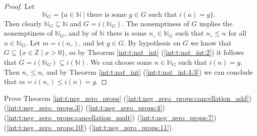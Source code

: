 \begin{proof}
	Let
	\[
		\mathbb{N}_{G} = \{ a \in \mathbb{N} \mid \text{there is some } g \in G \text{ such that } i(a) = g \}.
	\]
	Then clearly $\mathbb{N}_{G} \subseteq \mathbb{N}$ and $G = i(\mathbb{N}_{G})$. The nonemptiness of $G$ implies the nonemptiness of $\mathbb{N}_{G}$, and by  of $\mathbb{N}$ there is some $n_{\circ} \in \mathbb{N}_{G}$ such that $n_{\circ} \leq n$ for all ${n \in \mathbb{N}_{G}}$. Let $m = i(n_{\circ})$, and let $g \in G$. By hypothesis on $G$ we know that ${G \subseteq \{ x \in \mathbb{Z} \mid x > 0 \}}$, so by Theorem \ref{int:t:nat_int} (\ref{int:t:nat_int:2}) it follows that $G = i(\mathbb{N}_{G}) \subseteq i(\mathbb{N})$. We can choose some $n \in \mathbb{N}_{G}$ such that $i(n) = g$. Then $n_{\circ} \leq n$, and by Theorem \ref{int:t:nat_int} (\ref{int:t:nat_int:4:3}) we can conclude that $m = i(n_{\circ}) \leq i(n) = g$.
\end{proof}


\Newpage
\begin{exercise} %
	\label{int:e:11}
	Prove Theorem \ref{int:t:neg_zero_props} (\ref{int:t:neg_zero_props:cancellation_add}) (\ref{int:t:neg_zero_props:3}) (\ref{int:t:neg_zero_props:4}) (\ref{int:t:neg_zero_props:cancellation_mult}) (\ref{int:t:neg_zero_props:7}) (\ref{int:t:neg_zero_props:10}) (\ref{int:t:neg_zero_props:11}).
\end{exercise}

